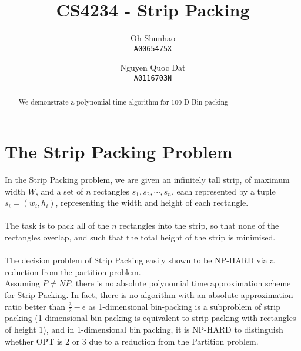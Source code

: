 \documentclass{article}
\begin{document}
\author{
Oh Shunhao\\
  \texttt{A0065475X}
  \and
Nguyen Quoc Dat\\
  \texttt{A0116703N}
}
\title{CS4234 - Strip Packing}
\date{}

\maketitle

\begin{abstract}
We demonstrate a polynomial time algorithm for 100-D Bin-packing
\end{abstract}

\section{The Strip Packing Problem}
In the Strip Packing problem, we are given an infinitely tall strip, of maximum width $W$, and a set of $n$ rectangles $s_1,s_2,\cdots,s_n$, each represented by a tuple $s_i = (w_i,h_i)$, representing the width and height of each rectangle.\\
\\
The task is to pack all of the $n$ rectangles into the strip, so that none of the rectangles overlap, and such that the total height of the strip is minimised.\\
\\
The decision problem of Strip Packing easily shown to be NP-HARD via a reduction from the partition problem.\\

Assuming $P \neq NP$, there is no absolute polynomial time approximation scheme for Strip Packing. In fact, there is no algorithm with an absolute approximation ratio better than $\frac{3}{2} - \epsilon$ as 1-dimensional bin-packing is a subproblem of strip packing (1-dimensional bin packing is equivalent to strip packing with rectangles of height $1$), and in 1-dimensional bin packing, it is NP-HARD to distinguish whether OPT is $2$ or $3$ due to a reduction from the Partition problem.
\end{document}
